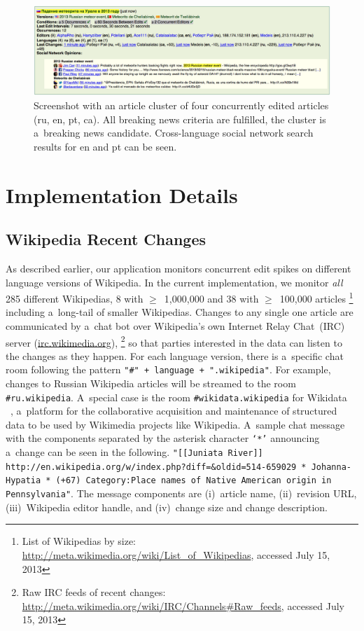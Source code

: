 \begin{figure}[!ht]
  \centering
  \includegraphics[width=\linewidth]{wikipedia-live-monitor.png}
  \caption[Screenshot with an article cluster of four concurrently edited articles]
    {Screenshot with an article cluster of four concurrently edited articles
    (ru, en, pt, ca). All breaking news criteria are fulfilled,
    the cluster is a~breaking news candidate.
    Cross-language social network search results for en and pt can be seen.}
  \label{fig:screenshotwikilivemon}
\end{figure}

\section{Implementation Details}

\subsection{Wikipedia Recent Changes}
\label{sec:wikipedia-recent-changes}

As described earlier, our application monitors concurrent edit spikes
on different language versions of Wikipedia.
In the current implementation, we monitor \emph{all}
285 different Wikipedias, 8 with 
$\geq$~1,000,000 and 38 with $\geq$~100,000 articles%
\footnote{List of Wikipedias by size: \url{http://meta.wikimedia.org/wiki/List_of_Wikipedias},
accessed July 15, 2013}
including a~long-tail of smaller Wikipedias.
Changes to any single one article are communicated by a~chat bot
over Wikipedia's own Internet Relay Chat~(IRC) server (\url{irc.wikimedia.org}),%
\footnote{Raw IRC feeds of recent changes: \url{http://meta.wikimedia.org/wiki/IRC/Channels\#Raw_feeds}, accessed July 15, 2013}
so that parties interested in the data can listen to the changes as they happen.
For each language version, there is a~specific chat room following the pattern
\texttt{"\#" + language + ".wikipedia"}.
For example, changes to Russian Wikipedia articles will be streamed to the room
\texttt{\#ru.wikipedia}.
A~special case is the room \texttt{\#wikidata.wikipedia} for Wikidata~%
~\cite{vrandecic2012wikidata},
a~platform for the collaborative acquisition and maintenance
of structured data to be used by
Wikimedia projects like Wikipedia.
A~sample chat message with the components separated
by the asterisk character \texttt{`*'}
announcing a~change can be seen in the following.
\texttt{"[[Juniata River]]
http://en.wikipedia.org/w/index.php?diff=\&oldid=514-659029 *
Johanna-Hypatia * (+67)
Category:Place names of Native American origin in Pennsylvania"}.
The message components are (i)~article name, (ii)~revision URL,
(iii)~Wikipedia editor handle, and (iv)~change size and change description.


